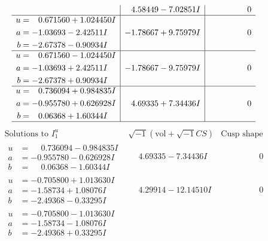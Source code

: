 \documentclass[1p]{elsarticle_modified}
\theoremstyle{definition}
\newcommand{\I}{\sqrt{-1}}
\begin{document}
$$\begin{array}{c|c|c}
 & \phantom{-}4.58449 - 7.02851 I & \phantom{-0.000000 } 0 \\ \hline\begin{aligned}
u &= \phantom{-}0.671560 + 1.024450 I \\
a &= -1.03693 - 2.42511 I \\
b &= -2.67378 - 0.90934 I\end{aligned}
 & -1.78667 + 9.75979 I & \phantom{-0.000000 } 0 \\ \hline\begin{aligned}
u &= \phantom{-}0.671560 - 1.024450 I \\
a &= -1.03693 + 2.42511 I \\
b &= -2.67378 + 0.90934 I\end{aligned}
 & -1.78667 - 9.75979 I & \phantom{-0.000000 } 0 \\ \hline\begin{aligned}
u &= \phantom{-}0.736094 + 0.984835 I \\
a &= -0.955780 + 0.626928 I \\
b &= \phantom{-}0.06368 + 1.60344 I\end{aligned}
 & \phantom{-}4.69335 + 7.34436 I & \phantom{-0.000000 } 0\\
 \hline 
 \end{array}$$\newpage$$\begin{array}{c|c|c}  
\text{Solutions to }I^u_{1}& \I (\text{vol} + \sqrt{-1}CS) & \text{Cusp shape}\\
 \hline 
\begin{aligned}
u &= \phantom{-}0.736094 - 0.984835 I \\
a &= -0.955780 - 0.626928 I \\
b &= \phantom{-}0.06368 - 1.60344 I\end{aligned}
 & \phantom{-}4.69335 - 7.34436 I & \phantom{-0.000000 } 0 \\ \hline\begin{aligned}
u &= -0.705800 + 1.013630 I \\
a &= -1.58734 + 1.08076 I \\
b &= -2.49368 - 0.33295 I\end{aligned}
 & \phantom{-}4.29914 - 12.14510 I & \phantom{-0.000000 } 0 \\ \hline\begin{aligned}
u &= -0.705800 - 1.013630 I \\
a &= -1.58734 - 1.08076 I \\
b &= -2.49368 + 0.33295 I\end{aligned}

\end{array}$$
\end{document}
